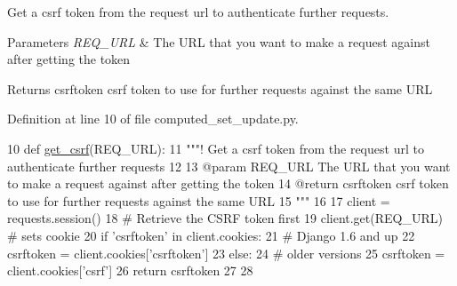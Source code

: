 Get a csrf token from the request url to authenticate further requests. 


\begin{DoxyParams}{Parameters}
{\em R\+E\+Q\+\_\+\+U\+RL} & The U\+RL that you want to make a request against after getting the token \\
\hline
\end{DoxyParams}
\begin{DoxyReturn}{Returns}
csrftoken csrf token to use for further requests against the same U\+RL 
\end{DoxyReturn}


Definition at line 10 of file computed\+\_\+set\+\_\+update.\+py.


\begin{DoxyCode}
10 \textcolor{keyword}{def }\hyperlink{namespacefragalysis__api_1_1xcextracter_1_1computed__set__update_a5737d189121121fcfc89d399bf38e877}{get\_csrf}(REQ\_URL):
11     \textcolor{stringliteral}{"""! Get a csrf token from the request url to authenticate further requests}
12 \textcolor{stringliteral}{}
13 \textcolor{stringliteral}{    @param REQ\_URL The URL that you want to make a request against after getting the token}
14 \textcolor{stringliteral}{    @return csrftoken csrf token to use for further requests against the same URL}
15 \textcolor{stringliteral}{    """}
16 
17     client = requests.session()
18     \textcolor{comment}{# Retrieve the CSRF token first}
19     client.get(REQ\_URL)  \textcolor{comment}{# sets cookie}
20     \textcolor{keywordflow}{if} \textcolor{stringliteral}{'csrftoken'} \textcolor{keywordflow}{in} client.cookies:
21         \textcolor{comment}{# Django 1.6 and up}
22         csrftoken = client.cookies[\textcolor{stringliteral}{'csrftoken'}]
23     \textcolor{keywordflow}{else}:
24         \textcolor{comment}{# older versions}
25         csrftoken = client.cookies[\textcolor{stringliteral}{'csrf'}]
26     \textcolor{keywordflow}{return} csrftoken
27 
28 
\end{DoxyCode}
\mbox{\label{namespacefragalysis__api_1_1xcextracter_1_1computed__set__update_a5065036bae4e3eea5df321d366767d29}} 
